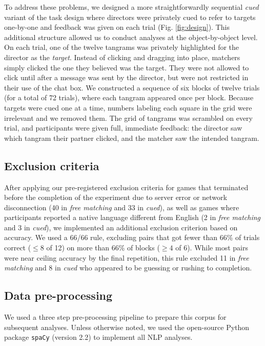 \documentclass[alpha-refs]{wiley-article}
\begin{document}
To address these problems, we designed a more straightforwardly sequential \emph{cued} variant of the task design where directors were privately cued to refer to targets one-by-one and feedback was given on each trial (Fig. \ref{fig:design}).
This additional structure allowed us to conduct analyses at the object-by-object level.
On each trial, one of the twelve tangrams was privately highlighted for the director as the \emph{target}.
Instead of clicking and dragging into place, matchers simply clicked the one they believed was the target.
They were not allowed to click until after a message was sent by the director, but were not restricted in their use of the chat box.
We constructed a sequence of six blocks of twelve trials (for a total of 72 trials), where each tangram appeared once per block.
Because targets were cued one at a time, numbers labeling each square in the grid were irrelevant and we removed them.
The grid of tangrams was scrambled on every trial, and participants were given full, immediate feedback: the director saw which tangram their partner clicked, and the matcher saw the intended tangram.

\subsection{Exclusion criteria}

After applying our pre-registered exclusion criteria for games that terminated before the completion of the experiment due to server error or network disconnection (40 in \emph{free matching} and 33 in \emph{cued}), as well as games where participants reported a native language different from English (2 in \emph{free matching} and 3 in \emph{cued}), we implemented an additional exclusion criterion based on accuracy.
We used a 66/66 rule, excluding pairs that got fewer than 66\% of trials correct ($\le8$ of 12)  on more than 66\% of blocks ($\ge4$ of 6).
While most pairs were near ceiling accuracy by the final repetition, this rule excluded 11 in \emph{free matching} and 8 in \emph{cued} who appeared to be guessing or rushing to completion.

\subsection{Data pre-processing}

We used a three step pre-processing pipeline to prepare this corpus for subsequent analyses. Unless otherwise noted, we used the open-source Python package \texttt{spaCy} (version 2.2) to implement all NLP analyses.
\end{document}
